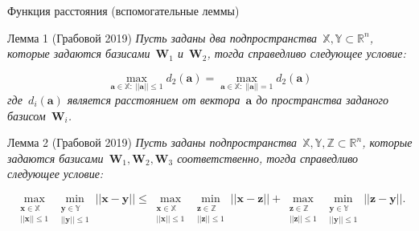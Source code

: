 \documentclass[10pt,pdf,hyperref={unicode}]{beamer}
\begin{document}
\begin{frame}[shrink=5]{Функция расстояния (вспомогательные леммы)}

\begin{block}{Лемма 1 (Грабовой 2019)}
\textit{Пусть заданы два подпространства~$\mathbb{X}, \mathbb{Y} \subset \mathbb{R}^{n}$, которые задаются базисами~$\textbf{W}_1$ и~$\textbf{W}_2$, тогда справедливо следующее условие:}

$$
\max_{\textbf{a} \in \mathbb{X}:~\left|\left|\textbf{a}\right|\right|\leq 1}d_2\left(\textbf{a}\right) = \max_{\textbf{a} \in \mathbb{X}:~\left|\left|\textbf{a}\right|\right|= 1}d_2\left(\textbf{a}\right)
$$
\textit{где~$d_i\left(\textbf{a}\right)$ является расстоянием от вектора~$\textbf{a}$ до пространства заданого базисом~$\textbf{W}_i$.
}
\end{block}

\begin{block}{Лемма 2 (Грабовой 2019)}
\textit{Пусть заданы подпространства~$\mathbb{X}, \mathbb{Y}, \mathbb{Z} \subset \mathbb{R}^{n}$, которые задаются базисами~$\textbf{W}_1, \textbf{W}_2, \textbf{W}_3$ соответственно, тогда справедливо следующее условие:}

$$
\max_{\substack{\textbf{x} \in \mathbb{X} \\ \left|\left|\textbf{x}\right|\right|\leq 1}}\min_{\substack{\textbf{y} \in \mathbb{Y} \\ \left|\left|\textbf{y}\right|\right|\leq 1}}||\textbf{x}-\textbf{y}||\leq 
\max_{\substack{\textbf{x} \in \mathbb{X} \\ \left|\left|\textbf{x}\right|\right|\leq 1}}\min_{\substack{\textbf{z} \in \mathbb{Z} \\ \left|\left|\textbf{z}\right|\right|\leq 1}}||\textbf{x}-\textbf{z}|| + 
\max_{\substack{\textbf{z} \in \mathbb{Z} \\ \left|\left|\textbf{z}\right|\right|\leq 1}}\min_{\substack{\textbf{y} \in \mathbb{Y} \\ \left|\left|\textbf{y}\right|\right|\leq 1}}||\textbf{z}-\textbf{y}||.
$$
\end{block}

\end{frame}

\end{document}
